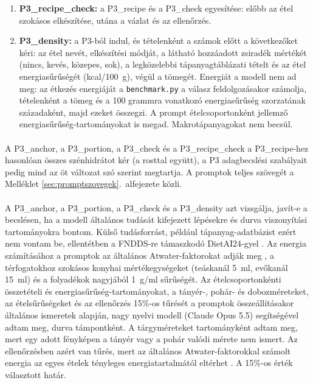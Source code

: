 \begin{enumerate}
    meg a tömeget (főtt ételeknél a prompt szerint ez jellemzően a tömeg 10--40\%-a, olajoknál és 
    zsiradékoknál legfeljebb 100\%); minden étel és ital pontosan egyszer szerepelhet; az összes 
    tömegnek és energiának hihetőnek kell lennie a képen látható ételhez. A javításokat a leírásmezőben 
    rögzíti, a javított értékeket a tétellistába írja.
    \item \textbf{P3\_recipe\_check:} a P3\_recipe és a P3\_check egyesítése: előbb az étel 
    szokásos elkészítése, utána a vázlat és az ellenőrzés.
    \item \textbf{P3\_density:} a P3-ból indul, és tételenként a számok előtt a következőket kéri: 
    az étel nevét, elkészítési módját, a látható hozzáadott zsiradék mértékét (nincs, kevés, 
    közepes, sok), a legközelebbi tápanyagtáblázati tételt és az étel energiasűrűségét 
    (kcal/100~g), végül a tömegét. Energiát a modell nem ad meg: az étkezés energiáját a 
    \texttt{benchmark.py} a válasz feldolgozásakor számolja, tételenként a tömeg és a 100 grammra 
    vonatkozó energiasűrűség szorzatának századaként, majd ezeket összegzi. A prompt 
    ételcsoportonként jellemző energiasűrűség-tartományokat is megad. 
    Makrotápanyagokat nem becsül.
\end{enumerate}
\paragraph{}A P3\_anchor, a P3\_portion, a P3\_check és a P3\_recipe\_check a P3\_recipe-hez 
hasonlóan összes szénhidrátot kér (a rosttal együtt), a P3 adagbecslési szabályait pedig mind az 
öt változat szó szerint megtartja.
A promptok teljes szövegét a Melléklet \ref{sec:promptszovegek}.~alfejezete közli.

\paragraph{}A P3\_anchor, a P3\_portion, a P3\_check és a P3\_density azt vizsgálja, javít-e a 
becslésen, ha a modell általános tudását kifejezett lépésekre és durva viszonyítási 
tartományokra bontom. Külső tudásforrást, például tápanyag-adatbázist ezért nem vontam be, 
ellentétben a FNDDS-re támaszkodó DietAI24-gyel \cite{yan2025dietai24}. Az energia 
számításához a promptok az általános Atwater-faktorokat adják meg \cite{fao2003foodenergy}, 
a térfogatokhoz szokásos konyhai mértékegységeket (teáskanál 5~ml, evőkanál 15~ml) és a 
folyadékok nagyjából 1~g/ml sűrűségét. Az ételcsoportonkénti összetételi és energiasűrűség-tartományokat, 
a tányér-, pohár- és dobozméreteket, az ételsűrűségeket és az ellenőrzés 15\%-os tűrését a 
promptok összeállításakor általános ismeretek alapján, nagy nyelvi modell (Claude Opus 5.5) segítségével adtam meg, 
durva támpontként. A tárgyméreteket tartományként adtam meg, mert egy adott fényképen 
a tányér vagy a pohár valódi mérete nem ismert. Az ellenőrzésben azért van tűrés, mert az 
általános Atwater-faktorokkal számolt energia az egyes ételek tényleges energiatartalmától 
eltérhet \cite{fao2003foodenergy}. A 15\%-os érték választott határ.

